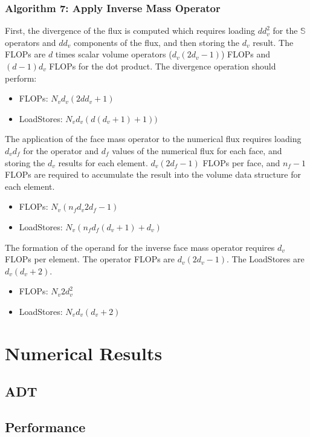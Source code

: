 \documentclass[11pt]{article}
\begin{document}
\subsubsection{Algorithm 7: Apply Inverse Mass Operator}
First, the divergence of the flux is computed which requires loading $d d_v^2$ for the $\mathbb{S}$ operators and $d d_v$ components of the flux, and then storing the $d_v$ result.  The FLOPs are $d$ times scalar volume operators ($d_v(2d_v - 1)$) FLOPs and $(d-1)d_v$ FLOPs for the dot product.  The divergence operation should perform:

\begin{itemize}
\item FLOPs: $N_v d_v (2 d d_v + 1)$
\item LoadStores: $N_v d_v (d (d_v + 1) + 1))$
\end{itemize}

The application of the face mass operator to the numerical flux requires loading $d_v d_f$ for the operator and $d_f$ values of the numerical flux for each face, and storing the $d_v$ results for each element. $d_v (2d_f-1)$ FLOPs per face, and $n_f-1$ FLOPs are required to accumulate the result into the volume data structure for each element.

\begin{itemize}
\item FLOPs: $N_v (n_f d_v 2d_f - 1)$
\item LoadStores: $N_v (n_f d_f(d_v + 1) + d_v)$
\end{itemize}

The formation of the operand for the inverse face mass operator requires $d_v$ FLOPs per element. The operator FLOPs are $d_v(2d_v - 1)$.  The LoadStores are $d_v(d_v + 2)$.

\begin{itemize}
\item FLOPs: $N_v 2 d_v^2$
\item LoadStores: $N_v d_v(d_v + 2)$
\end{itemize}

\section{Numerical Results}
\subsection{ADT}
\subsection{Performance}
\end{document}
